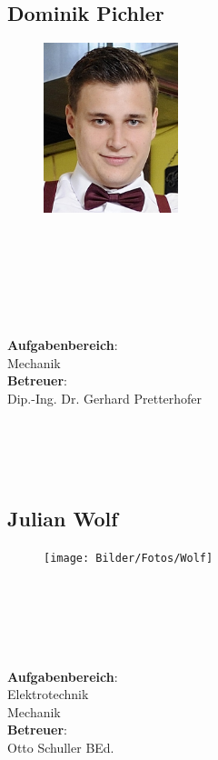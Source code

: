 \subsection*{Dominik Pichler}
\begin{figure}
\begin{center}
  \includegraphics[width=0.35\textwidth]{Bilder/Fotos/Pichler}
\end{center}
\end{figure}
\mbox{}\\
\mbox{}\\
\mbox{}\\
\mbox{}\\
\mbox{}\\
\mbox{}\\
\textbf{Aufgabenbereich}:\\
Mechanik\\
\textbf{Betreuer}:\\
Dip.-Ing. Dr. Gerhard Pretterhofer
\mbox{}\\
\mbox{}\\
\mbox{}\\
\mbox{}\\
\mbox{}\\

\subsection*{Julian Wolf}
\begin{figure}
\begin{center}
  \texttt{[image: Bilder/Fotos/Wolf]}
\end{center}
\end{figure}
\mbox{}\\
\mbox{}\\
\mbox{}\\
\mbox{}\\
\mbox{}\\
\textbf{Aufgabenbereich}:\\
Elektrotechnik\\
Mechanik\\
\textbf{Betreuer}:\\
Otto Schuller BEd.